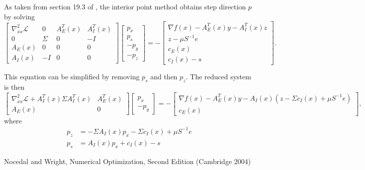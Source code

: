 \documentclass{article}
\begin{document}
As taken from section 19.3 of \cite{NW04}, 
    the interior point method obtains step direction $p$ by solving
\begin{equation}
\begin{bmatrix}
    \nabla^2_{xx}\mathcal{L} & 0 & A_E^T(x) & A_I^T(x) \\
    0 & \Sigma & 0 & -I \\
    A_E(x) & 0 & 0 & 0 \\
    A_I(x) & -I & 0 & 0
\end{bmatrix}
\begin{bmatrix} p_x \\ p_s \\ -p_y \\ -p_z \end{bmatrix}
    = -
\begin{bmatrix}
    \nabla f(x) - A_E^T(x) y - A_I^T(x) z \\
    z - \mu S^{-1} e \\
    c_E(x) \\
    c_I(x) - s
\end{bmatrix}.
\end{equation}

This equation can be simplified by removing $p_s$ and then $p_z$.
The reduced system is then
\begin{equation}
\begin{bmatrix}
    \nabla^2_{xx}\mathcal{L} + A_I^T(x) \Sigma A_I^T(x) & A_E^T(x) \\
    A_E(x) & 0 
\end{bmatrix}
\begin{bmatrix} p_x \\ -p_y \end{bmatrix}
    = -
\begin{bmatrix}
    \nabla f(x) - A_E^T(x) y - A_I(x) (z - \Sigma c_I(x) + \mu S^{-1} e) \\
    c_E(x)
\end{bmatrix},
\end{equation}
where
\begin{align}
    p_z &= -\Sigma A_I(x) p_x - \Sigma c_I(x) + \mu S^{-1} e \\
    p_s &= A_I(x) p_x + c_I(x) - s
\end{align}


\begin{thebibliography}{99}
 Nocedal and Wright, 
    Numerical Optimization, Second Edition (Cambridge 2004)
\end{thebibliography}
\end{document}
